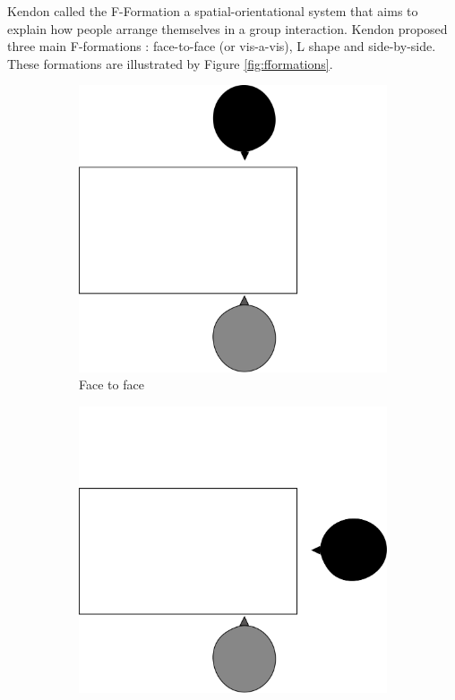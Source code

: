 \documentclass[letterpaper, 10 pt, conference]{ieeeconf}  %
\begin{document}
Kendon \cite{Kendon2010} called the F-Formation a spatial-orientational system that aims to explain how people arrange themselves in a group interaction.
Kendon proposed three main F-formations : face-to-face (or vis-a-vis), L shape and side-by-side. These formations are illustrated by Figure \ref{fig:fformations}.
\begin{figure}
	\centering
	\begin{subfigure}{0.2\textwidth}
		\centering
		\includegraphics[width=0.8\linewidth]{./figures/fformationff.png}
		\caption{Face to face}
		\label{fig:ff}
	\end{subfigure}%
	\begin{subfigure}{0.2\textwidth}
		\centering
		\includegraphics[width=0.8\linewidth]{./figures/fformationL.png}

\end{subfigure}
\end{figure}
\end{document}
